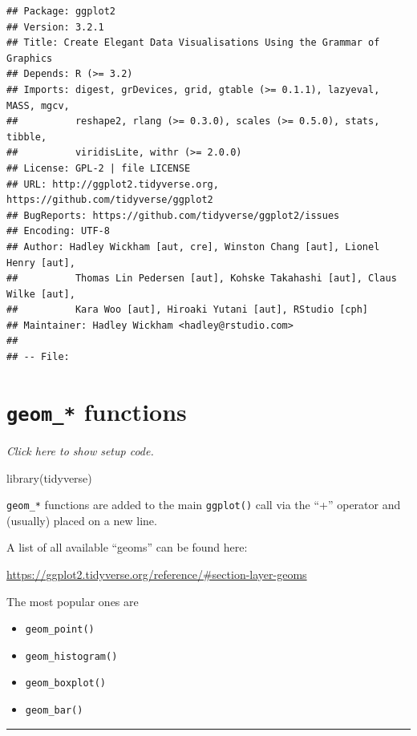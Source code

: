 \documentclass[]{book}
\newenvironment{Shaded}{}{}
\newcommand{\KeywordTok}[1]{\textcolor[rgb]{0.00,0.00,1.00}{#1}}
\newcommand{\NormalTok}[1]{#1}
\begin{document}
\begin{verbatim}
## Package: ggplot2
## Version: 3.2.1
## Title: Create Elegant Data Visualisations Using the Grammar of Graphics
## Depends: R (>= 3.2)
## Imports: digest, grDevices, grid, gtable (>= 0.1.1), lazyeval, MASS, mgcv,
##          reshape2, rlang (>= 0.3.0), scales (>= 0.5.0), stats, tibble,
##          viridisLite, withr (>= 2.0.0)
## License: GPL-2 | file LICENSE
## URL: http://ggplot2.tidyverse.org, https://github.com/tidyverse/ggplot2
## BugReports: https://github.com/tidyverse/ggplot2/issues
## Encoding: UTF-8
## Author: Hadley Wickham [aut, cre], Winston Chang [aut], Lionel Henry [aut],
##          Thomas Lin Pedersen [aut], Kohske Takahashi [aut], Claus Wilke [aut],
##          Kara Woo [aut], Hiroaki Yutani [aut], RStudio [cph]
## Maintainer: Hadley Wickham <hadley@rstudio.com>
## 
## -- File:
\end{verbatim}

\hypertarget{geom_-functions}{%
\section{\texorpdfstring{\texttt{geom\_*} functions}{geom\_* functions}}\label{geom_-functions}}

\emph{Click here to show setup code.}

\begin{Shaded}
\begin{Highlighting}[]
\KeywordTok{library}\NormalTok{(tidyverse)}
\end{Highlighting}
\end{Shaded}

\texttt{geom\_*} functions are added to the main \texttt{ggplot()} call via the ``+'' operator and
(usually) placed on a new line.

A list of all available ``geoms'' can be found here:

\url{https://ggplot2.tidyverse.org/reference/\#section-layer-geoms}

The most popular ones are

\begin{itemize}
\item
  \texttt{geom\_point()}
\item
  \texttt{geom\_histogram()}
\item
  \texttt{geom\_boxplot()}
\item
  \texttt{geom\_bar()}
\end{itemize}

\begin{center}\rule{0.5\linewidth}{\linethickness}\end{center}
\end{document}

